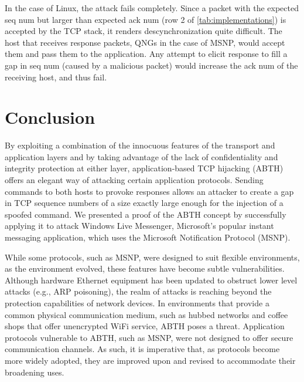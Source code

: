 \documentclass{sig-alternate}
\begin{document}
In the case of Linux, the attack fails completely.
Since a packet with the expected seq num but larger than expected ack num (row 2 of \ref{tab:implementations}) is accepted by the TCP stack, it renders descynchronization quite difficult.
The host that receives response packets, QNGs in the case of MSNP, would accept them and pass them to the application.
Any attempt to elicit response to fill a gap in seq num (caused by a malicious packet) would increase the ack num of the receiving host, and thus fail.

\section{Conclusion}
\label{sec:conclusion}

By exploiting a combination of the innocuous features of the transport and application layers and by taking advantage of the lack of confidentiality and integrity protection at either layer, application-based TCP hijacking (ABTH) offers an elegant way of attacking certain application protocols.
Sending commands to both hosts to provoke responses allows an attacker to create a gap in TCP sequence numbers of a size exactly large enough for the injection of a spoofed command.
We presented a proof of the ABTH concept by successfully applying it to attack Windows Live Messenger, Microsoft's popular instant messaging application, which uses the Microsoft Notification Protocol (MSNP).

While some protocols, such as MSNP, were designed to suit flexible environments, as the environment evolved, these features have become subtle vulnerabilities.
Although hardware Ethernet equipment has been updated to obstruct lower level attacks (e.g., ARP poisoning), the realm of attacks is reaching beyond the protection capabilities of network devices.
In environments that provide a common physical communication medium, such as hubbed networks and coffee shops that offer unencrypted WiFi service, ABTH poses a threat.
Application protocols vulnerable to ABTH, such as MSNP, were not designed to offer secure communication channels.
As such, it is imperative that, as protocols become more widely adopted, they are improved upon and revised to accommodate their broadening uses.

\vfil\eject



\end{document}
